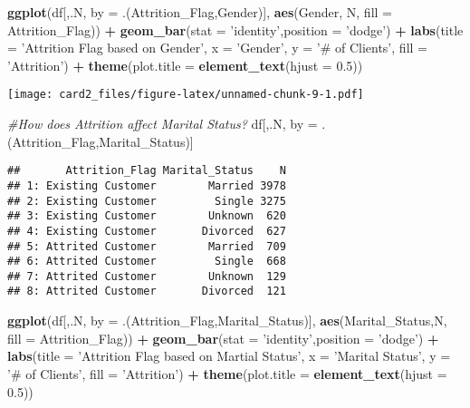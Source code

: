 \documentclass[]{article}
\newenvironment{Shaded}{\begin{snugshade}}{\end{snugshade}}
\newcommand{\CommentTok}[1]{\textcolor[rgb]{0.56,0.35,0.01}{\textit{#1}}}
\newcommand{\DataTypeTok}[1]{\textcolor[rgb]{0.13,0.29,0.53}{#1}}
\newcommand{\FloatTok}[1]{\textcolor[rgb]{0.00,0.00,0.81}{#1}}
\newcommand{\KeywordTok}[1]{\textcolor[rgb]{0.13,0.29,0.53}{\textbf{#1}}}
\newcommand{\NormalTok}[1]{#1}
\newcommand{\OperatorTok}[1]{\textcolor[rgb]{0.81,0.36,0.00}{\textbf{#1}}}
\newcommand{\StringTok}[1]{\textcolor[rgb]{0.31,0.60,0.02}{#1}}
\begin{document}
\begin{Shaded}
\begin{Highlighting}[]
\KeywordTok{ggplot}\NormalTok{(df[,.N, }\DataTypeTok{by =}\NormalTok{ .(Attrition_Flag,Gender)], }\KeywordTok{aes}\NormalTok{(Gender, N, }\DataTypeTok{fill =}\NormalTok{ Attrition_Flag)) }\OperatorTok{+}\StringTok{ }\KeywordTok{geom_bar}\NormalTok{(}\DataTypeTok{stat =} \StringTok{'identity'}\NormalTok{,}\DataTypeTok{position =} \StringTok{'dodge'}\NormalTok{) }\OperatorTok{+}\StringTok{ }\KeywordTok{labs}\NormalTok{(}\DataTypeTok{title =} \StringTok{'Attrition Flag based on Gender'}\NormalTok{, }\DataTypeTok{x =} \StringTok{'Gender'}\NormalTok{, }\DataTypeTok{y =} \StringTok{'# of Clients'}\NormalTok{, }\DataTypeTok{fill =} \StringTok{'Attrition'}\NormalTok{) }\OperatorTok{+}\StringTok{ }
\StringTok{  }\KeywordTok{theme}\NormalTok{(}\DataTypeTok{plot.title =} \KeywordTok{element_text}\NormalTok{(}\DataTypeTok{hjust =} \FloatTok{0.5}\NormalTok{))}
\end{Highlighting}
\end{Shaded}

\texttt{[image: card2\_files/figure-latex/unnamed-chunk-9-1.pdf]}

\begin{Shaded}
\begin{Highlighting}[]
\CommentTok{#How does Attrition affect Marital Status?}
\NormalTok{df[,.N, by =}\StringTok{ }\NormalTok{.(Attrition_Flag,Marital_Status)]}
\end{Highlighting}
\end{Shaded}

\begin{verbatim}
##       Attrition_Flag Marital_Status    N
## 1: Existing Customer        Married 3978
## 2: Existing Customer         Single 3275
## 3: Existing Customer        Unknown  620
## 4: Existing Customer       Divorced  627
## 5: Attrited Customer        Married  709
## 6: Attrited Customer         Single  668
## 7: Attrited Customer        Unknown  129
## 8: Attrited Customer       Divorced  121
\end{verbatim}

\begin{Shaded}
\begin{Highlighting}[]
\KeywordTok{ggplot}\NormalTok{(df[,.N, }\DataTypeTok{by =}\NormalTok{ .(Attrition_Flag,Marital_Status)], }\KeywordTok{aes}\NormalTok{(Marital_Status,N, }\DataTypeTok{fill =}\NormalTok{ Attrition_Flag)) }\OperatorTok{+}\StringTok{ }\KeywordTok{geom_bar}\NormalTok{(}\DataTypeTok{stat =} \StringTok{'identity'}\NormalTok{,}\DataTypeTok{position =} \StringTok{'dodge'}\NormalTok{) }\OperatorTok{+}\StringTok{ }\KeywordTok{labs}\NormalTok{(}\DataTypeTok{title =} \StringTok{'Attrition Flag based on Martial Status'}\NormalTok{, }\DataTypeTok{x =} \StringTok{'Marital Status'}\NormalTok{, }\DataTypeTok{y =} \StringTok{'# of Clients'}\NormalTok{, }\DataTypeTok{fill =} \StringTok{'Attrition'}\NormalTok{)  }\OperatorTok{+}\StringTok{ }\KeywordTok{theme}\NormalTok{(}\DataTypeTok{plot.title =} \KeywordTok{element_text}\NormalTok{(}\DataTypeTok{hjust =} \FloatTok{0.5}\NormalTok{))}
\end{Highlighting}
\end{Shaded}
\end{document}
